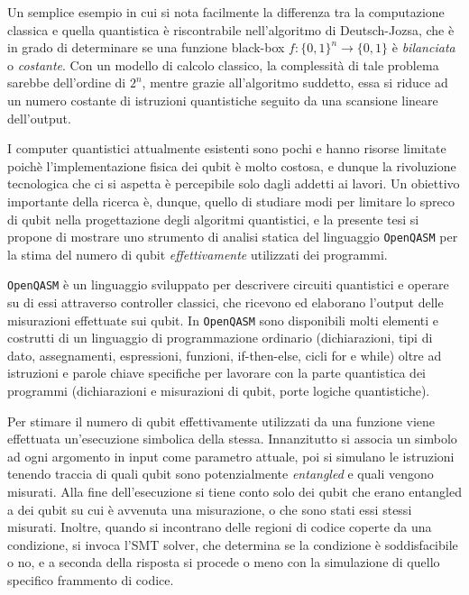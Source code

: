 \documentclass[12pt,a4paper]{report}
\theoremstyle{definition}
\theoremstyle{definition}
\theoremstyle{definition}
\begin{document}
Un semplice esempio in cui si nota facilmente la differenza tra la computazione classica e quella quantistica è riscontrabile nell'algoritmo di Deutsch-Jozsa, che è in grado di determinare se una funzione black-box $f: \{0,1\}^n \longrightarrow \{0,1\}$ è \emph{bilanciata} o \emph{costante}. Con un modello di calcolo classico, la complessità di tale problema sarebbe dell'ordine di $2^n$, mentre grazie all'algoritmo suddetto, essa si riduce ad un numero costante di istruzioni quantistiche seguito da una scansione lineare dell'output.

I computer quantistici attualmente esistenti sono pochi e hanno risorse limitate poichè l'implementazione fisica dei qubit è molto costosa, e dunque la rivoluzione tecnologica che ci si aspetta è percepibile solo dagli addetti ai lavori. Un obiettivo importante della ricerca è, dunque, quello di studiare modi per limitare lo spreco di qubit nella progettazione degli algoritmi quantistici, e la presente tesi si propone di mostrare uno strumento di analisi statica del linguaggio \texttt{OpenQASM} per la stima del numero di qubit \emph{effettivamente} utilizzati dei programmi.

\texttt{OpenQASM} è un linguaggio sviluppato per descrivere circuiti quantistici e operare su di essi attraverso controller classici, che ricevono ed elaborano l'output delle misurazioni effettuate sui qubit. In \texttt{OpenQASM} sono disponibili molti elementi e costrutti di un linguaggio di programmazione ordinario (dichiarazioni, tipi di dato, assegnamenti, espressioni, funzioni, if-then-else, cicli for e while) oltre ad istruzioni e parole chiave specifiche per lavorare con la parte quantistica dei programmi (dichiarazioni e misurazioni di qubit, porte logiche quantistiche).

Per stimare il numero di qubit effettivamente utilizzati da una funzione viene effettuata un'esecuzione simbolica della stessa. Innanzitutto si associa un simbolo ad ogni argomento in input come parametro attuale, poi si simulano le istruzioni tenendo traccia di quali qubit sono potenzialmente \textit{entangled} e quali vengono misurati. Alla fine dell'esecuzione si tiene conto solo dei qubit che erano entangled a dei qubit su cui è avvenuta una misurazione, o che sono stati essi stessi misurati. Inoltre, quando si incontrano delle regioni di codice coperte da una condizione, si invoca l'SMT solver, che determina se la condizione è soddisfacibile o no, e a seconda della risposta si procede o meno con la simulazione di quello specifico frammento di codice.
\end{document}
